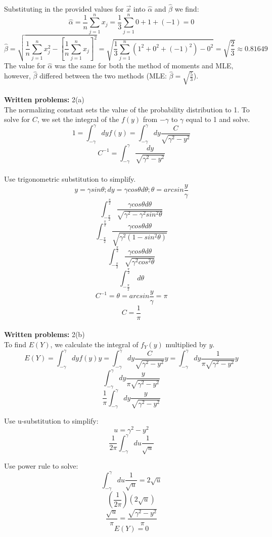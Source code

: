 \documentclass [12pt] {article}
\begin{document}
\\
Substituting in the provided values for $\vec{x}$ into $\hat{\alpha}$ and $\hat{\beta}$ we find:
\[ \hat{\alpha}= \frac{1}{n}\sum_{j=1}^{n}x_{j} = \frac{1}{3}\sum_{j=1}^{n}0+1+(-1) = 0 \]
\[ \hat{\beta} = \sqrt{\frac{1}{n}\sum_{j=1}^{n}x_{j}^{2} - [\frac{1}{n}\sum_{j=1}^{n}x_{j}]^2} = \sqrt{\frac{1}{3}\sum_{j=1}^{n}(1^2+0^2+(-1)^2) - 0^2} = \sqrt{\frac{2}{3}} \approx 0.81649 \]
The value for $\hat{\alpha}$ was the same for both the method of moments and MLE, however, $\hat{\beta}$ differed between the two methods (MLE: $\hat{\beta} = \sqrt{\frac{5}{3}}$).\\
\\
\noindent \textbf{Written problems:} 2(a)\\
The normalizing constant sets the value of the probability distribution to 1. To solve for $C$, we set the integral of the $f(y)$ from $-\gamma$ to $\gamma$ equal to 1 and solve.\\
\[ 1 = \int_{-\gamma}^{\gamma} dyf(y) = \int_{-\gamma}^{\gamma}dy\frac{C}{\sqrt{\gamma^2-y^2}} \]
\[ C^{-1} = \int_{-\gamma}^{\gamma}\frac{dy}{\sqrt{\gamma^2-y^2}} \]
\\
Use trigonometric substitution to simplify.
\[ y = \gamma sin\theta; dy = \gamma cos\theta d\theta; \theta = arcsin\frac{y}{\gamma} \]
\[  \int_{-\frac{\pi}{2}}^{\frac{\pi}{2}}\frac{\gamma cos\theta d\theta}{\sqrt{\gamma^2-\gamma^2sin^2\theta}} \]
\[ \int_{-\frac{\pi}{2}}^{\frac{\pi}{2}}\frac{\gamma cos\theta d\theta}{\sqrt{\gamma^2(1-sin^2\theta)}} \]
\[ \int_{-\frac{\pi}{2}}^{\frac{\pi}{2}}\frac{\gamma cos\theta d\theta}{\sqrt{\gamma^2cos^2\theta}} \]
\[ \int_{-\frac{\pi}{2}}^{\frac{\pi}{2}}\ d\theta \]
\[ C^{-1} = \theta = arcsin\frac{y}{\gamma} = \pi \]
\[ C = \frac{1}{\pi} \]
\\
\noindent \textbf{Written problems:} 2(b)\\
To find $E(Y)$, we calculate the integral of $f_Y(y)$ multiplied by $y$.
\[ E(Y) = \int_{-\gamma}^{\gamma} dyf(y)y = \int_{-\gamma}^{\gamma}dy\frac{C}{\sqrt{\gamma^2-y^2}}y =\int_{-\gamma}^{\gamma}dy\frac{1}{\pi\sqrt{\gamma^2-y^2}}y \]
\[ \int_{-\gamma}^{\gamma}dy\frac{y}{\pi\sqrt{\gamma^2-y^2}} \]
\[ \frac{1}{\pi}\int_{-\gamma}^{\gamma}dy\frac{y}{\sqrt{\gamma^2-y^2}} \]

Use u-substitution to simplify:\\
\[ u = \gamma^2-y^2\]
\[ \frac{1}{2\pi}\int_{-\gamma}^{\gamma}du\frac{1}{\sqrt{u}} \]

Use power rule to solve:
\[ \int_{-\gamma}^{\gamma}du\frac{1}{\sqrt{u}} = 2\sqrt{u}\]
\[ (\frac{1}{2\pi})(2\sqrt{u})\]
\[ \frac{\sqrt{u}}{\pi} = \frac{\sqrt{\gamma^2-y^2}}{\pi} \]
\[ E(Y) = 0 \]
\end{document}
